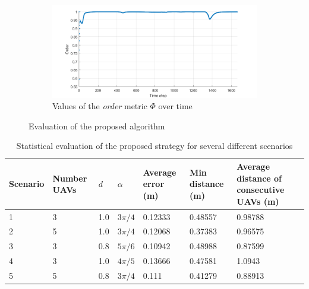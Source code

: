 \begin{figure}[t]
\begin{subfigure}[b]{0.49\textwidth}
    \label{fig:chap2_mean}
    \end{subfigure}
    \begin{subfigure}[b]{0.49\textwidth}
    \includegraphics[width=\textwidth]{paper1/images/heading.png}
    \caption{Values of the \textit{order} metric $\Phi$ over time}
    \label{fig:chap2_heading}
    \end{subfigure}
    \caption{Evaluation of the proposed algorithm}
    \label{fig:chap2_eval}
\end{figure}

\begin{table}[!]
\centering
\caption{Statistical evaluation of the proposed strategy for several different scenarios}
\label{tbl:chap2_sta}
\begin{tabular}{C{1.2cm}C{1.5cm}C{1cm}C{1cm}C{2cm}C{2cm}C{3.5cm}}
\hline
Scenario & Number UAVs & $d$ & $\alpha$    & Average error (m) & Min distance (m) & Average distance of consecutive UAVs (m) \\      & 3        & 1.0   & $3\pi/4$             & 0.12333   & 0.48557   & 0.98788                      \\
2     & 5        & 1.0   & $3\pi/4$    & 0.12068   & 0.37383   & 0.96575                      \\
3     & 3        & 0.8   & $5\pi/6$    & 0.10942   & 0.48988   & 0.87599                      \\
4     & 3        & 1.0   & $4\pi/5$    & 0.13666   & 0.47581   & 1.0943                       \\
5     & 5        & 0.8   & $3\pi/4$    & 0.111     & 0.41279   & 0.88913     \\ \hline                
\end{tabular}
\end{table}

